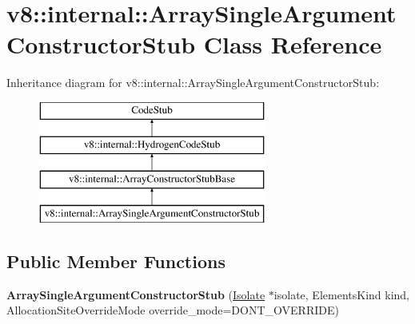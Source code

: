 \hypertarget{classv8_1_1internal_1_1_array_single_argument_constructor_stub}{}\section{v8\+:\+:internal\+:\+:Array\+Single\+Argument\+Constructor\+Stub Class Reference}
\label{classv8_1_1internal_1_1_array_single_argument_constructor_stub}
Inheritance diagram for v8\+:\+:internal\+:\+:Array\+Single\+Argument\+Constructor\+Stub\+:\begin{figure}[H]
\begin{center}
\leavevmode
\includegraphics[height=4.000000cm]{classv8_1_1internal_1_1_array_single_argument_constructor_stub}
\end{center}
\end{figure}
\subsection*{Public Member Functions}
\begin{DoxyCompactItemize}
\item 
{\bfseries Array\+Single\+Argument\+Constructor\+Stub} (\hyperlink{classv8_1_1internal_1_1_isolate}{Isolate} $\ast$isolate, Elements\+Kind kind, Allocation\+Site\+Override\+Mode override\+\_\+mode=D\+O\+N\+T\+\_\+\+O\+V\+E\+R\+R\+I\+DE)\hypertarget{classv8_1_1internal_1_1_array_single_argument_constructor_stub_a0cd99a369645effeaa12c445b17084bc}{}\label{classv8_1_1internal_1_1_array_single_argument_constructor_stub_a0cd99a369645effeaa12c445b17084bc}

\end{DoxyCompactItemize}
